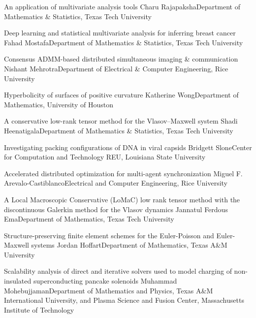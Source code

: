 \begin{posters}
\item\poster %
{An application of multivariate analysis tools}
{Charu Rajapaksha}{Department of Mathematics \& Statistics, Texas Tech University}

\item\poster %
{Deep learning and statistical multivariate analysis for inferring breast cancer}
{Fahad Mostafa}{Department of Mathematics \& Statistics, Texas Tech University}

\item\poster %
{Consensus ADMM-based distributed simultaneous imaging \& communication}
{Nishant Mehrotra}{Department of Electrical \& Computer Engineering, Rice University}

\item\poster %
{Hyperbolicity of surfaces of positive curvature}
{Katherine Wong}{Department of Mathematics, University of Houston}

\item\poster %
{A conservative low-rank tensor method for the Vlasov–Maxwell system}
{Shadi Heenatigala}{Department of Mathematics \& Statistics, Texas Tech University}

\item\poster %
{Investigating packing configurations of DNA in viral capsids}
{Bridgett Slone}{Center for Computation and Technology REU, Louisiana State University}

\item\poster %
{Accelerated distributed optimization for multi-agent synchronization}
{Miguel F. Arevalo-Castiblanco}{Electrical and Computer Engineering, Rice University}

\item\poster %
{A Local Macroscopic Conservative (LoMaC) low rank tensor method with the discontinuous Galerkin method for the Vlasov dynamics}
{Jannatul Ferdous Ema}{Department of Mathematics, Texas Tech University}

\item\poster %
{Structure-preserving finite element schemes for the Euler-Poisson and Euler-Maxwell systems}
{Jordan Hoffart}{Department of Mathematics, Texas A\&M University}

\item\poster %
{Scalability analysis of direct and iterative solvers used to model charging of non-insulated superconducting pancake solenoids}
{Muhammad Mohebujjaman}{Department of Mathematics and Physics, Texas A\&M International University, and Plasma Science and Fusion Center, Massachusetts Institute of Technology}


\end{posters}

